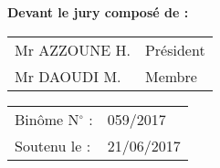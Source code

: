 \begin{titlepage}
\begin{center}
\vspace{\fill}

\textbf{Devant le jury composé de :}

\vspace{0.5em}

\begin{minipage}[c]{0.5\textwidth}
\begin{tabular}{p{} l}
Mr AZZOUNE H. & Président \\
Mr DAOUDI M. & Membre
\end{tabular}
\end{minipage}

\vfill

\begin{tabular}{l l}
  Binôme N$^\circ$ : & 059/2017\\
  Soutenu le : & 21/06/2017
\end{tabular}
\end{center}
\end{titlepage}
